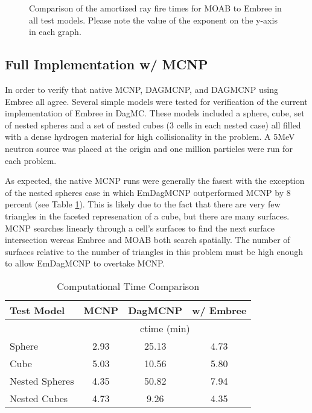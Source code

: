 \documentclass{anstrans}
\begin{document}
\begin{figure}[H]

  \begin{center}
    
    \caption{Comparison of the amortized ray fire times for MOAB to Embree in all test models. Please note the value of the exponent on the y-axis in each graph.}
    
  \end{center}

\end{figure}

\subsection{Full Implementation w/ MCNP}

In order to verify that native MCNP, DAGMCNP, and DAGMCNP using Embree all agree. Several simple models were tested for verification of the current implementation of Embree in DagMC. These models included a sphere, cube, set of nested spheres and a set of nested cubes (3 cells in each nested case) all filled with a dense hydrogen material for high collisionality in the problem. A 5MeV neutron source was placed at the origin and one million particles were run for each problem.

As expected, the native MCNP runs were generally the fasest with the exception of the nested spheres case in which EmDagMCNP outperformed MCNP by 8 percent (see Table \ref{timings}). This is likely due to the fact that there are very few triangles in the faceted represenation of a cube, but there are many surfaces. MCNP searches linearly through a cell's surfaces to find the next surface intersection wereas Embree and MOAB both search spatially. The number of surfaces relative to the number of triangles in this problem must be high enough to allow EmDagMCNP to overtake MCNP. 

\begin{table}[H]

  \begin{center}

      \caption{Computational Time Comparison}
      \label{timings}
    \begin{tabular}{lccc}



      \toprule
      Test Model & MCNP & DagMCNP & w/ Embree \\
      \hline
      &  \multicolumn{3}{c}{ctime (min)} \\
      \hline
      Sphere & 2.93 & 25.13 & 4.73  \\
      Cube & 5.03 & 10.56  & 5.80 \\
      Nested Spheres & 4.35 & 50.82 & 7.94 \\
      Nested Cubes & 4.73 & 9.26 & 4.35 \\
      \bottomrule
      
    \end{tabular}
  \end{center}
  \end{table}
\end{document}
